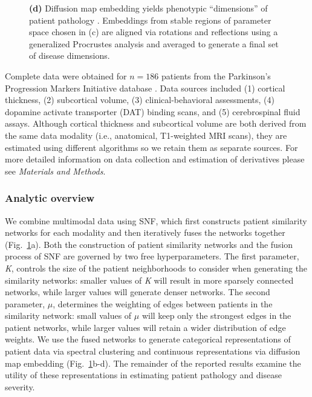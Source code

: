 \documentclass[12pt,aps,pra,reprint,showkeys]{revtex4-1}
\begin{document}
\begin{figure}[t]
\begin{center}
{      \textbf{(d)} Diffusion map embedding yields phenotypic ``dimensions'' of patient pathology \citep{coifman2005geometric}.
      Embeddings from stable regions of parameter space chosen in (c) are aligned via rotations and reflections using a generalized Procrustes analysis and averaged to generate a final set of disease dimensions.
      }
    \label{figure-snf-parameter-search}
  \end{center}
\end{figure}

Complete data were obtained for $n = 186$ patients from the Parkinson's Progression Markers Initiative database \citep{marek2011progneurobiol}.
Data sources included (1) cortical thickness, (2) subcortical volume, (3) clinical-behavioral assessments, (4) dopamine activate transporter (DAT) binding scans, and (5) cerebrospinal fluid assays. 
Although cortical thickness and subcortical volume are both derived from the same data modality (i.e., anatomical, T1-weighted MRI scans), they are estimated using different algorithms so we retain them as separate sources.
For more detailed information on data collection and estimation of derivatives please see \textit{Materials and Methods}.

\subsubsection*{Analytic overview}

We combine multimodal data using SNF, which first constructs patient similarity networks for each modality and then iteratively fuses the networks together (Fig.~\ref{figure-snf-parameter-search}a).
Both the construction of patient similarity networks and the fusion process of SNF are governed by two free hyperparameters.
The first parameter, \emph{K}, controls the size of the patient neighborhoods to consider when generating the similarity networks: smaller values of \emph{K} will result in more sparsely connected networks, while larger values will generate denser networks.
The second parameter, $\mu$, determines the weighting of edges between patients in the similarity network: small values of $\mu$ will keep only the strongest edges in the patient networks, while larger values will retain a wider distribution of edge weights.
We use the fused networks to generate categorical representations of patient data via spectral clustering and continuous representations via diffusion map embedding (Fig.~\ref{figure-snf-parameter-search}b-d).
The remainder of the reported results examine the utility of these representations in estimating patient pathology and disease severity.
\end{document}
